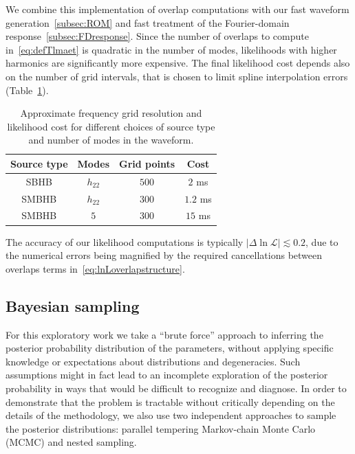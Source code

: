 \documentclass[aps,showpacs,twocolumn,prd,superscriptaddress,nofootinbib]{revtex4-1}
\newcommand\calL{{\mathcal{L}}}
\begin{document}
We combine this implementation of overlap computations with our fast waveform generation~\ref{subsec:ROM} and fast treatment of the Fourier-domain response~\ref{subsec:FDresponse}. Since the number of overlaps to compute in~\eqref{eq:defTlmaet} is quadratic in the number of modes, likelihoods with higher harmonics are significantly more expensive. The final likelihood cost depends also on the number of grid intervals, that is chosen to limit spline interpolation errors (Table~\ref{tab:likecost}).
\begin{table}
	\begin{tabular}{|c|c|c|c|}
		\hline
		Source type & Modes & Grid points & Cost \\
		\hline
		SBHB & $h_{22}$ & $500$ & $2$ ms \\
		SMBHB & $h_{22}$ & $300$ & $1.2$ ms \\
		SMBHB & $5$ & $300$ & $15$ ms \\
		\hline
	\end{tabular}
	\label{tab:likecost}
	\caption{Approximate frequency grid resolution and likelihood cost for different choices of source type and number of modes in the waveform.}
\end{table}
The accuracy of our likelihood computations is typically $|\Delta \ln \calL| \lesssim 0.2$, due to the numerical errors being magnified by the required cancellations between overlaps terms in~\eqref{eq:lnLoverlapstructure}.



\subsection{Bayesian sampling}
\label{subsec:samplers}

For this exploratory work we take a ``brute force'' approach to inferring the posterior probability distribution of the parameters, without applying specific knowledge or expectations about distributions and degeneracies. Such assumptions might in fact lead to an incomplete exploration of the posterior probability in ways that would be difficult to recognize and diagnose. In order to demonstrate that the problem is tractable without critically depending on the details of the methodology, we also use two independent approaches to sample the posterior distributions: parallel tempering Markov-chain Monte Carlo (MCMC) and nested sampling.
\end{document}

